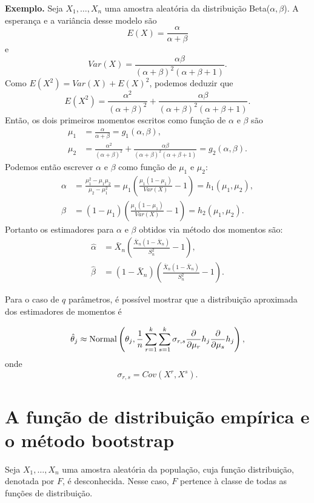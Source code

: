 \documentclass[
  letterpaper,
  DIV=11,
  numbers=noendperiod]{scrartcl}
\begin{document}
\textbf{Exemplo.} Seja \(X_1,\ldots,X_n\) uma amostra aleatória da
distribuição Beta(\(\alpha,\beta\)). A esperança e a variância desse
modelo são \[E(X)=\frac{\alpha}{\alpha+\beta}\] e
\[Var(X)=\frac{\alpha\beta}{(\alpha+\beta)^2(\alpha+\beta+1)}.\] Como
\(E(X^2)=Var(X)+E(X)^2\), podemos deduzir que
\[E(X^2)=\frac{\alpha^2}{(\alpha+\beta)^2}+\frac{\alpha\beta}{(\alpha+\beta)^2(\alpha+\beta+1)}.\]
Então, os dois primeiros momentos escritos como função de \(\alpha\) e
\(\beta\) são
\[\begin{align}\mu_1&=\frac{\alpha}{\alpha+\beta}=g_1(\alpha,\beta),\\
\mu_2&=\frac{\alpha^2}{(\alpha+\beta)^2}+\frac{\alpha\beta}{(\alpha+\beta)^2(\alpha+\beta+1)}=g_2(\alpha,\beta).\end{align}\]
Podemos então escrever \(\alpha\) e \(\beta\) como função de \(\mu_1\) e
\(\mu_2\):
\[\begin{align}\alpha&=\frac{\mu_1^2-\mu_1\mu_2}{\mu_2-\mu_1^2}=\mu_1\left(\frac{\mu_1(1-\mu_1)}{Var(X)}-1\right)=h_1(\mu_1,\mu_2),\\
\beta&=(1-\mu_1)\left(\frac{\mu_1(1-\mu_1)}{Var(X)}-1\right)=h_2(\mu_1,\mu_2).\end{align}\]
Portanto os estimadores para \(\alpha\) e \(\beta\) obtidos via método
dos momentos são:
\[\begin{align}\hat{\alpha}&=\bar{X}_n\left(\frac{\bar{X}_n(1-\bar{X}_n)}{S_n^2}-1\right),\\
\hat{\beta}&=(1-\bar{X}_n)\left(\frac{\bar{X}_n(1-\bar{X}_n)}{S_n^2}-1\right).\end{align}\]

Para o caso de \(q\) parâmetros, é possível mostrar que a distribuição
aproximada dos estimadores de momentos é

\[\hat{\theta}_j\approx \hbox{Normal}\left(\theta_j,\frac{1}{n}\sum_{r=1}^k\sum_{s=1}^k\sigma_{r,s}\frac{\partial}{\partial\mu_r}h_j\frac{\partial}{\partial\mu_s}h_j\right),\]
onde \[\sigma_{r,s}=Cov(X^r,X^s).\]

\section{A função de distribuição empírica e o método
bootstrap}\label{a-funuxe7uxe3o-de-distribuiuxe7uxe3o-empuxedrica-e-o-muxe9todo-bootstrap}

Seja \(X_1,\ldots,X_n\) uma amostra aleatória da população, cuja função
distribuição, denotada por \(F\), é desconhecida. Nesse caso, \(F\)
pertence à classe de todas as funções de distribuição.
\end{document}
